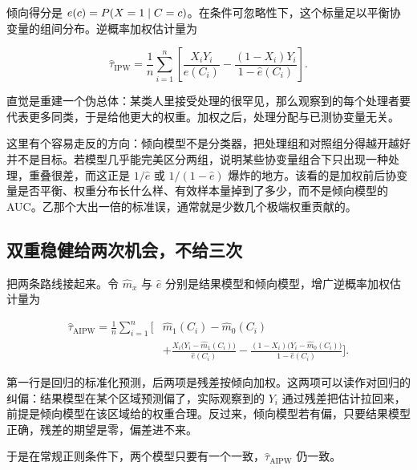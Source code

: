 倾向得分是 \(e(c)=P(X=1\mid C=c)\)。在条件可忽略性下，这个标量足以平衡协变量的组间分布。逆概率加权估计量为

\[
\widehat\tau_{\mathrm{IPW}}
=\frac1n\sum_{i=1}^{n}
\left[\frac{X_iY_i}{\widehat e(C_i)}-\frac{(1-X_i)Y_i}{1-\widehat e(C_i)}\right].
\]

直觉是重建一个伪总体：某类人里接受处理的很罕见，那么观察到的每个处理者要代表更多同类，于是给他更大的权重。加权之后，处理分配与已测协变量无关。

这里有个容易走反的方向：倾向模型不是分类器，把处理组和对照组分得越开越好并不是目标。若模型几乎能完美区分两组，说明某些协变量组合下只出现一种处理，重叠很差，而这正是 \(1/\widehat e\) 或 \(1/(1-\widehat e)\) 爆炸的地方。该看的是加权前后协变量是否平衡、权重分布长什么样、有效样本量掉到了多少，而不是倾向模型的 AUC。乙那个大出一倍的标准误，通常就是少数几个极端权重贡献的。

\subsection{双重稳健给两次机会，不给三次}

把两条路线接起来。令 \(\widehat m_x\) 与 \(\widehat e\) 分别是结果模型和倾向模型，增广逆概率加权估计量为

\[
\begin{aligned}
\widehat\tau_{\mathrm{AIPW}}=\frac1n\sum_{i=1}^{n}\Bigg[
&\widehat m_1(C_i)-\widehat m_0(C_i)\\
&+\frac{X_i\bigl(Y_i-\widehat m_1(C_i)\bigr)}{\widehat e(C_i)}
-\frac{(1-X_i)\bigl(Y_i-\widehat m_0(C_i)\bigr)}{1-\widehat e(C_i)}\Bigg].
\end{aligned}
\]

第一行是回归的标准化预测，后两项是残差按倾向加权。这两项可以读作对回归的纠偏：结果模型在某个区域预测偏了，实际观察到的 \(Y_i\) 通过残差把估计拉回来，前提是倾向模型在该区域给的权重合理。反过来，倾向模型若有偏，只要结果模型正确，残差的期望是零，偏差进不来。

于是在常规正则条件下，两个模型只要有一个一致，\(\widehat\tau_{\mathrm{AIPW}}\) 仍一致。

